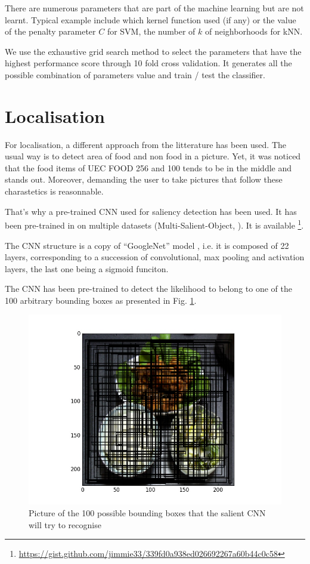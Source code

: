 There are numerous parameters that are part of the machine learning but are not learnt. Typical example include which kernel function used (if any) or the value of the penalty parameter $C$ for SVM, the number of $k$ of neighborhoods for kNN.

We use the exhaustive grid search method to select the parameters that have the highest performance score through 10 fold cross validation. It generates all the possible combination of parameters value and train / test the classifier.

\section{Localisation}

For localisation, a different approach from the litterature has been used. The usual way is to detect area of food and non food in a picture. Yet, it was noticed that the food items of UEC FOOD 256 and 100 tends to be in the middle and stands out. Moreover, demanding the user to take pictures that follow these charastetics is reasonnable.

That's why a pre-trained CNN used for saliency detection has been used. It has been pre-trained in \cite{zhang2015SOD} on multiple datasets (Multi-Salient-Object, ). It is available \footnote{\url{https://gist.github.com/jimmie33/339fd0a938ed026692267a60b44c0c58}}.

The CNN structure is a copy of \enquote{GoogleNet} model \cite{Szegedy2015}, i.e. it is composed of 22 layers, corresponding to a succession of convolutional, max pooling and activation layers, the last one being a sigmoid funciton.

The CNN has been pre-trained to detect the likelihood to belong to one of the 100 arbitrary bounding boxes as presented in Fig. \ref{fig:seg_100_bboxes}.

\begin{figure}
    \includegraphics[scale=0.5]{img/seg_100_bboxes.jpg}
    \caption{Picture of the 100 possible bounding boxes that the salient CNN will try to recognise}
    \label{fig:seg_100_bboxes}
\end{figure}


